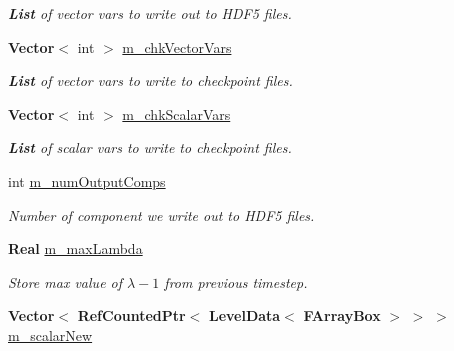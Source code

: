 \begin{DoxyCompactItemize}
\begin{DoxyCompactList}\small\item\em \textbf{ List} of vector vars to write out to H\+D\+F5 files. \end{DoxyCompactList}\item 
\mbox{\label{class_a_m_r_level_mushy_layer_a588ea6850fbe16d53bd496961ba5427b}} 
\textbf{ Vector}$<$ int $>$ \hyperlink{class_a_m_r_level_mushy_layer_a588ea6850fbe16d53bd496961ba5427b}{m\+\_\+chk\+Vector\+Vars}
\begin{DoxyCompactList}\small\item\em \textbf{ List} of vector vars to write to checkpoint files. \end{DoxyCompactList}\item 
\mbox{\label{class_a_m_r_level_mushy_layer_a8d09ec620023d399fcff3c8720d846c6}} 
\textbf{ Vector}$<$ int $>$ \hyperlink{class_a_m_r_level_mushy_layer_a8d09ec620023d399fcff3c8720d846c6}{m\+\_\+chk\+Scalar\+Vars}
\begin{DoxyCompactList}\small\item\em \textbf{ List} of scalar vars to write to checkpoint files. \end{DoxyCompactList}\item 
\mbox{\label{class_a_m_r_level_mushy_layer_a0f6d029ffba9fced9eea9b9abc193302}} 
int \hyperlink{class_a_m_r_level_mushy_layer_a0f6d029ffba9fced9eea9b9abc193302}{m\+\_\+num\+Output\+Comps}
\begin{DoxyCompactList}\small\item\em Number of component we write out to H\+D\+F5 files. \end{DoxyCompactList}\item 
\textbf{ Real} \hyperlink{class_a_m_r_level_mushy_layer_a49000dfb8d30dc44b35fc1c802c9fd4c}{m\+\_\+max\+Lambda}
\begin{DoxyCompactList}\small\item\em Store max value of $ \lambda-1 $ from previous timestep. \end{DoxyCompactList}\item 
\mbox{\label{class_a_m_r_level_mushy_layer_a4937b8d2fdcfb86d57b7f197f91f5069}} 
\textbf{ Vector}$<$ \textbf{ Ref\+Counted\+Ptr}$<$ \textbf{ Level\+Data}$<$ \textbf{ F\+Array\+Box} $>$ $>$ $>$ \hyperlink{class_a_m_r_level_mushy_layer_a4937b8d2fdcfb86d57b7f197f91f5069}{m\+\_\+scalar\+New}

\end{DoxyCompactItemize}
